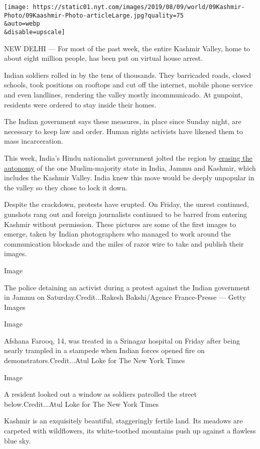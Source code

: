 \texttt{[image: https://static01.nyt.com/images/2019/08/09/world/09Kashmir-Photo/09Kaashmir-Photo-articleLarge.jpg?quality=75\\\&auto=webp\\\&disable=upscale]}

NEW DELHI --- For most of the past week, the entire Kashmir Valley, home
to about eight million people, has been put on virtual house arrest.

Indian soldiers rolled in by the tens of thousands. They barricaded
roads, closed schools, took positions on rooftops and cut off the
internet, mobile phone service and even landlines, rendering the valley
mostly incommunicado. At gunpoint, residents were ordered to stay inside
their homes.

The Indian government says these measures, in place since Sunday night,
are necessary to keep law and order. Human rights activists have likened
them to mass incarceration.

This week, India's Hindu nationalist government jolted the region by
\href{https://www.nytimes.com/2019/08/05/world/asia/india-pakistan-kashmir-jammu.html}{erasing
the autonomy} of the one Muslim-majority state in India, Jammu and
Kashmir, which includes the Kashmir Valley. India knew this move would
be deeply unpopular in the valley so they chose to lock it down.

Despite the crackdown, protests have erupted. On Friday, the unrest
continued, gunshots rang out and foreign journalists continued to be
barred from entering Kashmir without permission. These pictures are some
of the first images to emerge, taken by Indian photographers who managed
to work around the communication blockade and the miles of razor wire to
take and publish their images.

Image

The police detaining an activist during a protest against the Indian
government in Jammu on Saturday.Credit...Rakesh Bakshi/Agence
France-Presse --- Getty Images

Image

Afshana Farooq, 14, was treated in a Srinagar hospital on Friday after
being nearly trampled in a stampede when Indian forces opened fire on
demonstrators.Credit...Atul Loke for The New York Times

Image

A resident looked out a window as soldiers patrolled the street
below.Credit...Atul Loke for The New York Times

Kashmir is an exquisitely beautiful, staggeringly fertile land. Its
meadows are carpeted with wildflowers, its white-toothed mountains push
up against a flawless blue sky.


